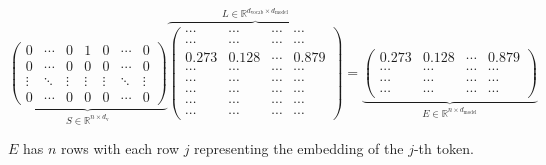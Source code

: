 $$
\underbrace{
    \begin{pmatrix}
    0 & \cdots & 0 & 1 & 0 & \cdots & 0 \\
    0 & \cdots & 0 & 0 & 0 & \cdots & 0 \\
    \vdots & \ddots & \vdots & \vdots & \vdots & \ddots & \vdots \\
    0 & \cdots & 0 & 0 & 0 & \cdots & 0
    \end{pmatrix}
}_{S\in \mathbb{R}^{n \times d_{\text{v}}}}
\overbrace{
    \begin{pmatrix}
    \cdots & \cdots & \cdots & \cdots \\
    \cdots & \cdots & \cdots & \cdots \\
    0.273  & 0.128  & \cdots & 0.879 \\
    \cdots & \cdots & \cdots & \cdots \\
    \cdots & \cdots & \cdots & \cdots \\
    \cdots & \cdots & \cdots & \cdots \\
    \cdots & \cdots & \cdots & \cdots \\
    \cdots & \cdots & \cdots & \cdots
    \end{pmatrix}
}^{L \in \mathbb{R}^{d_{\text{vocab}} \times d_{\text{model}}}}
=
\underbrace{
    \begin{pmatrix}
    0.273 & 0.128 & \cdots & 0.879 \\
    \cdots & \cdots & \cdots & \cdots \\
    \cdots & \cdots & \cdots & \cdots \\
    \cdots & \cdots & \cdots & \cdots
    \end{pmatrix}
}_{E \in \mathbb{R}^{n \times d_{\text{model}}}}
$$

$E$ has $n$ rows with each row $j$ representing the embedding of the $j$-th token.

